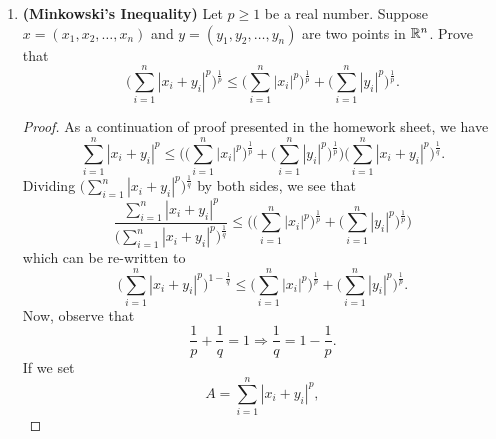\documentclass{article}
\begin{document}
\begin{enumerate}
\begin{proof}
    \begin{align*}  \sum_{ i=1  }^{ n } \Big| \Big(  \frac{ {x}_{i} }{ a }  \Big) \Big(  \frac{ {y}_{i} }{ b }  \Big) \Big| \leq 1 &\Longrightarrow \sum_{ i=1  }^{ n }  \Big|  \frac{ {x}_{i} }{ a }  \Big| \Big|  \frac{ {y}_{i} }{ b }  \Big| \leq 1  \\
        &\Longrightarrow \frac{ 1 }{ ab } \sum_{ i=1  }^{ n } | {x}_{i} |  | {y}_{i} | \\
        &\Longrightarrow \sum_{ i=1  }^{ n } | {x}_{i} {y}_{i}  | \leq ab = \Big(  \sum_{ i=1  }^{ n } | {x}_{i} |^{p} \Big)^{\frac{ 1 }{ p } } \Big(  \sum_{ i=1  }^{ n } | {y}_{i} |^{q} \Big)^{\frac{ 1 }{ q }}.
    \end{align*}
    \end{proof}
\item \textbf{(Minkowski's Inequality)} Let \( p \geq 1  \) be a real number. Suppose \( x = ({x}_{1}, {x}_{2}, \dots, {x}_{n})  \) and \( y = ({y}_{1}, {y}_{2}, \dots, {y}_{n})  \) are two points in \( \mathbb{R}^{n} \). Prove that 
    \[  \Big(  \sum_{ i=1  }^{ n } | {x}_{i} + {y}_{i} |^{p} \Big)^{\frac{ 1 }{ p }} \leq \Big(  \sum_{ i=1  }^{ n } | {x}_{i} |^{p} \Big)^{\frac{ 1 }{ p }} + \Big(  \sum_{ i=1  }^{ n } | {y}_{i} |^{p} \Big)^{\frac{ 1 }{ p }}. \]
    \begin{proof}
    As a continuation of proof presented in the homework sheet, we have
    \[  \sum_{ i=1  }^{ n } | {x}_{i} + {y}_{i} |^{p} \leq \Bigg( \Big(  \sum_{ i=1  }^{ n } | {x}_{i} |^{p} \Big)^{\frac{ 1 }{ p }} + \Big(  \sum_{ i=1  }^{ n } | {y}_{i} |^{p} \Big)^{\frac{ 1 }{ p }}     \Bigg) \Big(  \sum_{ i=1  }^{ n } | {x}_{i} + {y}_{i} |^{p}  \Big)^{\frac{ 1 }{ q } }. \]
    Dividing \( \Big(  \sum_{ i=1  }^{ n } | {x}_{i} + {y}_{i} |^{p} \Big)^{\frac{ 1 }{ q } } \) by both sides, we see that 
    \[  \frac{ \sum_{ i=1  }^{ n } | {x}_{i} + {y}_{i} |^{p} }{ \Big(  \sum_{ i=1  }^{ n } | {x}_{i} + {y}_{i} |^{p} \Big)^{\frac{ 1 }{ q } } } \leq  \Bigg( \Big(  \sum_{ i=1  }^{ n } | {x}_{i} |^{p} \Big)^{\frac{ 1 }{ p }} + \Big(  \sum_{ i=1  }^{ n } | {y}_{i} |^{p} \Big)^{\frac{ 1 }{ p }}     \Bigg) \]
    which can be re-written to 
    \[  \Big(  \sum_{ i=1  }^{ n } | {x}_{i} + {y}_{i} |^{p} \Big)^{1 - \frac{ 1 }{ q } } \leq  \Big(  \sum_{ i=1  }^{ n } | {x}_{i} |^{p} \Big)^{\frac{ 1 }{ p }} + \Big(  \sum_{ i=1  }^{ n } | {y}_{i} |^{p} \Big)^{\frac{ 1 }{ p }}.   \]
    Now, observe that 
    \[  \frac{ 1 }{ p }  + \frac{ 1 }{ q }  = 1 \Longrightarrow \frac{ 1 }{ q }  = 1 - \frac{ 1 }{ p }. \]
    If we set 
    \[  A =  \sum_{ i=1  }^{ n } | {x}_{i} + {y}_{i} |^{p},   \]

\end{proof}
\end{enumerate}
\end{document}
